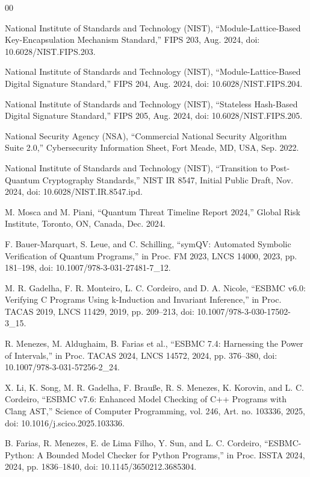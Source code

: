 \documentclass[journal]{IEEEtran} %
\begin{document}
\begin{thebibliography}{00}

 National Institute of Standards and Technology (NIST), “Module-Lattice-Based Key-Encapsulation Mechanism Standard,” FIPS 203, Aug. 2024, doi: 10.6028/NIST.FIPS.203.

 National Institute of Standards and Technology (NIST), “Module-Lattice-Based Digital Signature Standard,” FIPS 204, Aug. 2024, doi: 10.6028/NIST.FIPS.204.

 National Institute of Standards and Technology (NIST), “Stateless Hash-Based Digital Signature Standard,” FIPS 205, Aug. 2024, doi: 10.6028/NIST.FIPS.205.

 National Security Agency (NSA), “Commercial National Security Algorithm Suite 2.0,” Cybersecurity Information Sheet, Fort Meade, MD, USA, Sep. 2022.

 National Institute of Standards and Technology (NIST), “Transition to Post-Quantum Cryptography Standards,” NIST IR 8547, Initial Public Draft, Nov. 2024, doi: 10.6028/NIST.IR.8547.ipd.

 M. Mosca and M. Piani, “Quantum Threat Timeline Report 2024,” Global Risk Institute, Toronto, ON, Canada, Dec. 2024.

 F. Bauer-Marquart, S. Leue, and C. Schilling, “symQV: Automated Symbolic Verification of Quantum Programs,” in Proc. FM 2023, LNCS 14000, 2023, pp. 181–198, doi: 10.1007/978-3-031-27481-7\_12.

 M. R. Gadelha, F. R. Monteiro, L. C. Cordeiro, and D. A. Nicole, “ESBMC v6.0: Verifying C Programs Using k-Induction and Invariant Inference,” in Proc. TACAS 2019, LNCS 11429, 2019, pp. 209–213, doi: 10.1007/978-3-030-17502-3\_15.

 R. Menezes, M. Aldughaim, B. Farias et al., “ESBMC 7.4: Harnessing the Power of Intervals,” in Proc. TACAS 2024, LNCS 14572, 2024, pp. 376–380, doi: 10.1007/978-3-031-57256-2\_24.

 X. Li, K. Song, M. R. Gadelha, F. Brauße, R. S. Menezes, K. Korovin, and L. C. Cordeiro, “ESBMC v7.6: Enhanced Model Checking of C++ Programs with Clang AST,” Science of Computer Programming, vol. 246, Art. no. 103336, 2025, doi: 10.1016/j.scico.2025.103336.

 B. Farias, R. Menezes, E. de Lima Filho, Y. Sun, and L. C. Cordeiro, “ESBMC-Python: A Bounded Model Checker for Python Programs,” in Proc. ISSTA 2024, 2024, pp. 1836–1840, doi: 10.1145/3650212.3685304.


\end{thebibliography}
\end{document}
